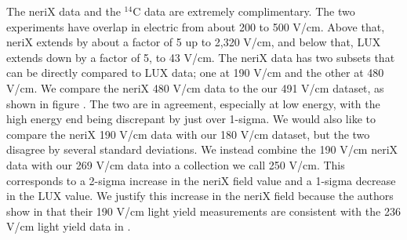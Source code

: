 The neriX data and the $^{14}$C data are extremely complimentary. The two experiments have overlap in electric from about 200 to 500 V/cm. Above that, neriX extends by about a factor of 5 up to 2,320 V/cm, and below that, LUX extends down by a factor of 5, to 43 V/cm. The neriX data has two subsets that can be directly compared to LUX data; one at 190 V/cm and the other at 480 V/cm. We compare the neriX 480 V/cm data to the our 491 V/cm dataset, as shown in figure \label{fig:betamod_nerixcomp}. The two are in agreement, especially at low energy, with the high energy end being discrepant by just over 1-sigma. We would also like to compare the neriX 190 V/cm data with our 180 V/cm dataset, but the two disagree by several standard deviations. We instead combine the 190 V/cm neriX data with our 269 V/cm data into a collection we call 250 V/cm. This corresponds to a 2-sigma increase in the neriX field value and a 1-sigma decrease in the LUX value. We justify this increase in the neriX field because the authors show in \cite{nerix} that their 190 V/cm light yield measurements are consistent with the 236 V/cm light yield data in \cite{xenon_tritium}.
